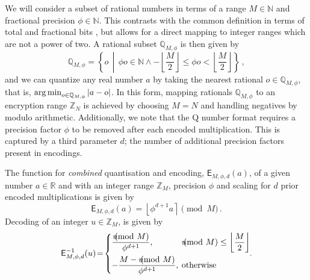 \documentclass[10pt,letterpaper,oneside,twocolumn,journal]{IEEEtran}
\theoremstyle{definition}
\theoremstyle{definition}
\theoremstyle{remark}
\begin{document}
We will consider a subset of rational numbers in terms of a range $M \in \mathbb{N}$ and fractional precision $\phi \in \mathbb{N}$. This contrasts with the common definition in terms of total and fractional bits \cite{oberstarFixedPointRepresentationFractional2007,schulzedarupEncryptedCooperativeControl2019,farokhiSecurePrivateControl2017}, but allows for a direct mapping to integer ranges which are not a power of two. A rational subset $\mathbb{Q}_{M,\phi}$ is then given by
\begin{equation}
    \mathbb{Q}_{M,\phi} = \left\{o \,\middle|\, \phi o \in \mathbb{N} \wedge -\left\lfloor\frac{M}{2}\right\rfloor \leq \phi o < \left\lfloor\frac{M}{2}\right\rfloor \right\}\,,
\end{equation}
and we can quantize any real number $a$ by taking the nearest rational $o \in \mathbb{Q}_{M,\phi}$, that is, $\operatorname*{arg\,min}_{o\in\mathbb{Q}_{M,\phi}} |a-o|$. In this form, mapping rationals $\mathbb{Q}_{M,\phi}$ to an encryption range $\mathbb{Z}_N$ is achieved by choosing $M=N$ and handling negatives by modulo arithmetic. Additionally, we note that the Q number format requires a precision factor $\phi$ to be removed after each encoded multiplication. This is captured by a third parameter $d$; the number of additional precision factors present in encodings.

The function for \textit{combined} quantisation and encoding, $\mathsf{E}_{M,\phi,d}(a)$, of a given number $a \in \mathbb{R}$ and with an integer range $\mathbb{Z}_M$, precision $\phi$ and scaling for $d$ prior encoded multiplications is given by
\begin{equation}
    \mathsf{E}_{M,\phi,d}(a) = \left\lfloor \phi^{d+1} a \right\rceil \pmod{M}\,. \label{eqn:encode}
\end{equation}
Decoding of an integer $u \in \mathbb{Z}_M$, is given by
\begin{equation}
    \mathsf{E}^{-1}_{M,\phi,d}(u) \!=\! 
    \begin{dcases}
        \frac{u\hspace{-8pt}\pmod{M}}{\phi^{d+1}}, &\hspace{-6pt}u\hspace{-8pt}\pmod{M} \leq \left\lfloor\frac{M}{2}\right\rfloor \\
        -\frac{M - u\hspace{-8pt}\pmod{M}}{\phi^{d+1}}, &\hspace{-6pt}\text{otherwise} \\
    \end{dcases}\!\!.\label{eqn:decode}
\end{equation}
\end{document}

